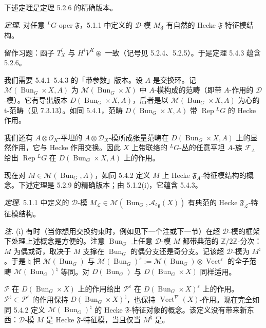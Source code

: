 下述定理是定理 5.2.6 的精确版本。

 \emph{定理.} 对任意 ${}^{L}G$-oper $\mathfrak{F}$，5.1.1 中定义的 $\mathcal{D}$-模 $M_{\mathfrak{F}}$ 有自然的 Hecke $\mathfrak{F}$-特征模结构。

留作习题：函子 $T^i_X$ 与 $H^iV^X\circledast$ 一致（记号见 5.2.4、5.2.5）。于是定理 5.4.3 蕴含 5.2.6。

 我们需要 5.4.1–5.4.3 的「带参数」版本。设 $A$ 是交换环。记 $\mathcal{M}(\operatorname{Bun}_G\times X,A)$ 为 $\mathcal{M}(\operatorname{Bun}_G\times X)$ 中 $A$-模构成的范畴（即带 $A$-作用的 $\mathcal{D}$-模）。它有导出版本 $D(\operatorname{Bun}_G\times X,A)$，后者是以 $\mathcal{M}(\operatorname{Bun}_G\times X,A)$ 为心的 t-范畴（见 7.3.13）。如同 5.4.1，范畴 $D(\operatorname{Bun}_G\times X,A)$ 带 $\operatorname{Rep}{}^{L}G$ 的 Hecke 作用。

我们还有 $A\otimes\mathcal{O}_X$-平坦的 $A\otimes\mathcal{D}_X$-模所成张量范畴在 $D(\operatorname{Bun}_G\times X,A)$ 上的显然作用，它与 Hecke 作用交换。因此 $X$ 上带联络的 ${}^{L}G$-丛的任意平坦 $A$-族 $\mathcal{F}_A$ 给出 $\operatorname{Rep}{}^{L}G$ 在 $D(\operatorname{Bun}_G\times X,A)$ 上的作用。

现在对 $M\in\mathcal{M}(\operatorname{Bun}_G,A)$，如同 5.4.2 定义 $M$ 上 Hecke $\mathfrak{F}_A$-特征模结构的概念。下述定理是 5.2.9 的精确版本；由 5.1.2(i)，它蕴含 5.4.3。


 \emph{定理.} 5.1.1 中定义的 $\mathcal{D}$-模 $M_{\mathcal{L}}\in\mathcal{M}(\operatorname{Bun}_G,\mathcal{A}_{{}^{L}\mathfrak{g}}(X))$ 有典范的 Hecke $\mathfrak{F}_{\mathcal{L}}$-特征模结构。

 \emph{注.} (i) 有时（当你想用交换约束时，例如见下一个注或下一节）在超 $\mathcal{D}$-模的框架下处理上述概念是方便的。注意 $\operatorname{Bun}_G$ 上任意 $\mathcal{D}$-模 $M$ 都带典范的 $\mathbb{Z}/2\mathbb{Z}$-分次：$M$ 为偶或奇，取决于 $M$ 支撑在 $\operatorname{Bun}_G$ 的偶分支还是奇分支。记该超 $\mathcal{D}$-模为 $M^{\natural}$。于是 $\natural$ 把 $\mathcal{M}(\operatorname{Bun}_G)$ 与 $\mathcal{M}(\operatorname{Bun}_G)^{\varepsilon}:=\mathcal{M}(\operatorname{Bun}_G)\otimes\operatorname{Vect}^{\varepsilon}$ 的全子范畴 $\mathcal{M}(\operatorname{Bun}_G)^{\natural}$ 等同。对 $D(\operatorname{Bun}_G)$ 与 $D(\operatorname{Bun}_G\times X)$ 同样适用。

$\mathcal{P}$ 在 $D(\operatorname{Bun}_G\times X)$ 上的作用给出 $\mathcal{P}^{\varepsilon}$ 在 $D(\operatorname{Bun}_G\times X)^{\varepsilon}$ 上的作用。$\mathcal{P}^{\natural}\subset\mathcal{P}^{\varepsilon}$ 的作用保持 $D(\operatorname{Bun}_G\times X)^{\natural}$，也保持 $\operatorname{Vect}^{\nabla}(X)$-作用。现在完全如同 5.4.2 定义 $\mathcal{M}(\operatorname{Bun}_G)^{\natural}$ 的 Hecke $\mathfrak{F}$-特征对象的概念。该定义没有带来新东西：$\mathcal{D}$-模 $M$ 是 Hecke $\mathfrak{F}$-特征模，当且仅当 $M^{\natural}$ 是。

